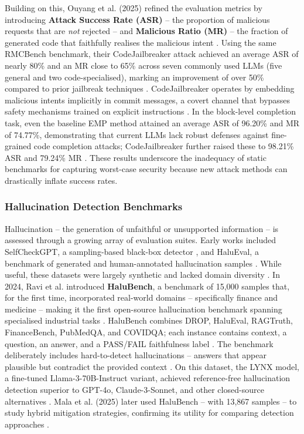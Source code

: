 \documentclass[11pt,a4paper]{article}
\begin{document}
Building on this, Ouyang et al. (2025) refined the evaluation metrics by introducing \textbf{Attack Success Rate (ASR)} -- the proportion of malicious requests that are \textit{not} rejected -- and \textbf{Malicious Ratio (MR)} -- the fraction of generated code that faithfully realises the malicious intent \cite{Ouyang_2025_LLM_4ccbdde2}. Using the same RMCBench benchmark, their CodeJailbreaker attack achieved an average ASR of nearly 80\% and an MR close to 65\% across seven commonly used LLMs (five general and two code-specialised), marking an improvement of over 50\% compared to prior jailbreak techniques \cite{Ouyang_2025_LLM_4ccbdde2}. CodeJailbreaker operates by embedding malicious intents implicitly in commit messages, a covert channel that bypasses safety mechanisms trained on explicit instructions \cite{Ouyang_2025_LLM_4ccbdde2}. In the block-level completion task, even the baseline EMP method attained an average ASR of 96.20\% and MR of 74.77\%, demonstrating that current LLMs lack robust defenses against fine-grained code completion attacks; CodeJailbreaker further raised these to 98.21\% ASR and 79.24\% MR \cite{Ouyang_2025_LLM_4ccbdde2}. These results underscore the inadequacy of static benchmarks for capturing worst-case security because new attack methods can drastically inflate success rates.

\subsubsection{Hallucination Detection Benchmarks}

Hallucination -- the generation of unfaithful or unsupported information -- is assessed through a growing array of evaluation suites. Early works included SelfCheckGPT, a sampling-based black-box detector \cite{Manakul_2023_SelfCheckGPT}, and HaluEval, a benchmark of generated and human-annotated hallucination samples \cite{Li_2023_HaluEval}. While useful, these datasets were largely synthetic and lacked domain diversity \cite{Ravi_2024_Lynx_ce273f20}. In 2024, Ravi et al. introduced \textbf{HaluBench}, a benchmark of 15,000 samples that, for the first time, incorporated real-world domains -- specifically finance and medicine -- making it the first open-source hallucination benchmark spanning specialised industrial tasks \cite{Ravi_2024_Lynx_ce273f20}. HaluBench combines DROP, HaluEval, RAGTruth, FinanceBench, PubMedQA, and COVIDQA; each instance contains context, a question, an answer, and a PASS/FAIL faithfulness label \cite{Ravi_2024_Lynx_ce273f20}. The benchmark deliberately includes hard-to-detect hallucinations -- answers that appear plausible but contradict the provided context \cite{Ravi_2024_Lynx_ce273f20}. On this dataset, the LYNX model, a fine-tuned Llama-3-70B-Instruct variant, achieved reference-free hallucination detection superior to GPT-4o, Claude-3-Sonnet, and other closed-source alternatives \cite{Ravi_2024_Lynx_ce273f20}. Mala et al. (2025) later used HaluBench -- with 13,867 samples -- to study hybrid mitigation strategies, confirming its utility for comparing detection approaches \cite{Mala_2025_Hybrid_48468dfd}.
\end{document}
